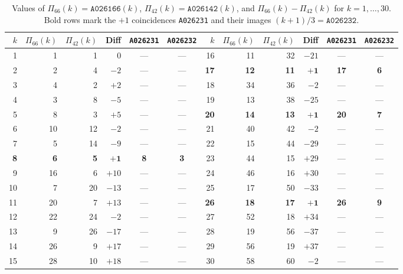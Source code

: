 \documentclass[11pt]{article}
\theoremstyle{definition}
\newcommand{\seq}[1]{\texttt{#1}}
\begin{document}
\begin{table}[ht]
\centering
\caption{Values of $\Pi_{66}(k) = \seq{A026166}(k)$, $\Pi_{42}(k) = \seq{A026142}(k)$, and $\Pi_{66}(k) - \Pi_{42}(k)$ for $k = 1, \dots, 30$. Bold rows mark the $+1$ coincidences \seq{A026231} and their images $(k+1)/3 = \seq{A026232}$.}
\label{tab:small-k}
\smallskip
{\small
\begin{tabular}{@{}rrrrcc|rrrrcc@{}}
\toprule
$k$ & $\Pi_{66}(k)$ & $\Pi_{42}(k)$ & Diff & \seq{A026231} & \seq{A026232} & $k$ & $\Pi_{66}(k)$ & $\Pi_{42}(k)$ & Diff & \seq{A026231} & \seq{A026232} \\
\midrule
1  & 1  & 1  & $0$   & --- & --- & 16 & 11 & 32 & $-21$ & --- & --- \\
2  & 2  & 4  & $-2$  & --- & --- & \textbf{17} & \textbf{12} & \textbf{11} & $\mathbf{+1}$ & \textbf{17} & \textbf{6} \\
3  & 4  & 2  & $+2$  & --- & --- & 18 & 34 & 36 & $-2$  & --- & --- \\
4  & 3  & 8  & $-5$  & --- & --- & 19 & 13 & 38 & $-25$ & --- & --- \\
5  & 8  & 3  & $+5$  & --- & --- & \textbf{20} & \textbf{14} & \textbf{13} & $\mathbf{+1}$ & \textbf{20} & \textbf{7} \\
6  & 10 & 12 & $-2$  & --- & --- & 21 & 40 & 42 & $-2$  & --- & --- \\
7  & 5  & 14 & $-9$  & --- & --- & 22 & 15 & 44 & $-29$ & --- & --- \\
\textbf{8} & \textbf{6} & \textbf{5} & $\mathbf{+1}$ & \textbf{8} & \textbf{3} & 23 & 44 & 15 & $+29$ & --- & --- \\
9  & 16 & 6  & $+10$ & --- & --- & 24 & 46 & 16 & $+30$ & --- & --- \\
10 & 7  & 20 & $-13$ & --- & --- & 25 & 17 & 50 & $-33$ & --- & --- \\
11 & 20 & 7  & $+13$ & --- & --- & \textbf{26} & \textbf{18} & \textbf{17} & $\mathbf{+1}$ & \textbf{26} & \textbf{9} \\
12 & 22 & 24 & $-2$  & --- & --- & 27 & 52 & 18 & $+34$ & --- & --- \\
13 & 9  & 26 & $-17$ & --- & --- & 28 & 19 & 56 & $-37$ & --- & --- \\
14 & 26 & 9  & $+17$ & --- & --- & 29 & 56 & 19 & $+37$ & --- & --- \\
15 & 28 & 10 & $+18$ & --- & --- & 30 & 58 & 60 & $-2$  & --- & --- \\
\bottomrule
\end{tabular}
}
\end{table}
\end{document}
